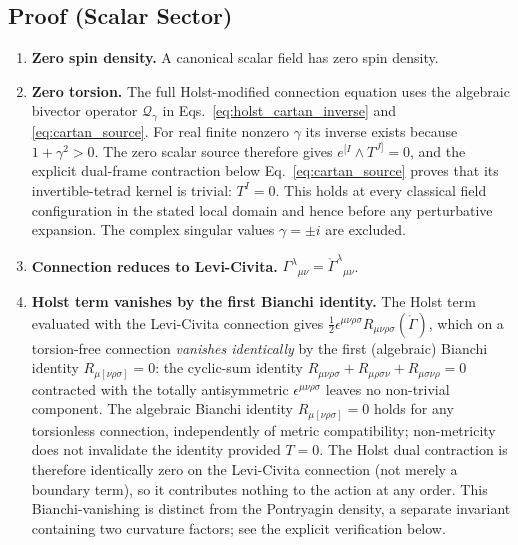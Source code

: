 \documentclass[aps,prd,twocolumn,superscriptaddress,showpacs,preprintnumbers,nofootinbib,longbibliography,floatfix]{revtex4-2}
\begin{document}
\subsection{Proof (Scalar Sector)}\label{sec:transp_proof}

\begin{enumerate}
\item \textbf{Zero spin density.} A canonical scalar field has zero spin density.

\item \textbf{Zero torsion.} The full Holst-modified connection equation uses
the algebraic bivector operator $\mathcal Q_\gamma$ in
Eqs.~\eqref{eq:holst_cartan_inverse} and \eqref{eq:cartan_source}.  For real
finite nonzero $\gamma$ its inverse exists because $1+\gamma^2>0$.  The zero
scalar source therefore gives $e^{[I}\wedge T^{J]}=0$, and the explicit
dual-frame contraction below Eq.~\eqref{eq:cartan_source} proves that its
invertible-tetrad kernel is trivial: $T^I=0$.  This holds at every classical
field configuration in the stated local domain and hence before any
perturbative expansion.  The complex singular values $\gamma=\pm i$ are
excluded.

\item \textbf{Connection reduces to Levi-Civita.} $\Gamma^\lambda{}_{\mu\nu}
= \mathring{\Gamma}^\lambda{}_{\mu\nu}$.

\item \textbf{Holst term vanishes by the first Bianchi identity.}
The Holst term evaluated with
the Levi-Civita connection gives $\frac{1}{2}\epsilon^{\mu\nu\rho\sigma}
R_{\mu\nu\rho\sigma}(\mathring{\Gamma})$, which on a torsion-free
connection \emph{vanishes identically} by the first (algebraic) Bianchi identity
$R_{\mu[\nu\rho\sigma]} = 0$: the cyclic-sum identity $R_{\mu\nu\rho\sigma} +
R_{\mu\rho\sigma\nu} + R_{\mu\sigma\nu\rho} = 0$ contracted with the totally
antisymmetric $\epsilon^{\mu\nu\rho\sigma}$ leaves no non-trivial component.
The algebraic Bianchi identity $R_{\mu[\nu\rho\sigma]}=0$ holds for any
torsionless connection, independently of metric compatibility; non-metricity
does not invalidate the identity provided $T=0$.
The Holst dual contraction is therefore identically zero on the Levi-Civita
connection (not merely a boundary term), so it contributes nothing to the
action at any order. This Bianchi-vanishing is distinct from the Pontryagin
density, a separate invariant containing two curvature factors; see the
explicit verification below.

\end{enumerate}
\end{document}

